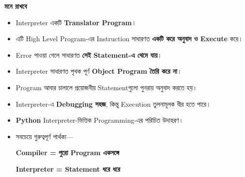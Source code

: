 \begin{rememberbox}

\textbf{\color{deepOrange}মনে রাখবে}

\begin{itemize}

\item Interpreter একটি \textbf{Translator Program}।

\item এটি High Level Program-এর Instruction সাধারণত
\textbf{একটি করে অনুবাদ ও Execute} করে।

\item Error পাওয়া গেলে সাধারণত
\textbf{সেই Statement-এ থেমে যায়}।

\item Interpreter সাধারণত পৃথক পূর্ণ
\textbf{Object Program তৈরি করে না}।

\item Program আবার চালালে প্রয়োজনীয় Statementগুলো পুনরায়
অনুবাদ করতে হয়।

\item Interpreter-এ \textbf{Debugging সহজ}, কিন্তু Execution
তুলনামূলক ধীর হতে পারে।

\item \textbf{Python} Interpreter-ভিত্তিক Programming-এর
পরিচিত উদাহরণ।

\item সবচেয়ে গুরুত্বপূর্ণ পার্থক্য—

\begin{center}

\textbf{
Compiler = পুরো Program একসঙ্গে
}

\textbf{
Interpreter = Statement ধরে ধরে
}

\end{center}

\end{itemize}

\end{rememberbox}

\small

